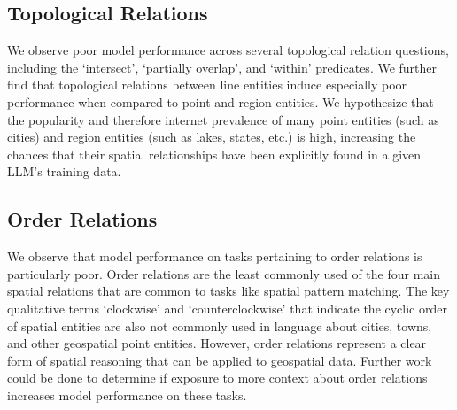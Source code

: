 \subsection{Topological Relations}
We observe poor model performance across several topological relation questions, including the `intersect', `partially overlap', and `within' predicates.
We further find that topological relations between line entities induce especially poor performance when compared to point and region entities.
We hypothesize that the popularity and therefore internet prevalence of many point entities (such as cities) and region entities (such as lakes, states, etc.) is high, increasing the chances that their spatial relationships have been explicitly found in a given LLM's training data.


\subsection{Order Relations}
We observe that model performance on tasks pertaining to order relations is particularly poor.
Order relations are the least commonly used of the four main spatial relations that are common to tasks like spatial pattern matching.
The key qualitative terms `clockwise' and `counterclockwise' that indicate the cyclic order of spatial entities are also not commonly used in language about cities, towns, and other geospatial point entities.
However, order relations represent a clear form of spatial reasoning that can be applied to geospatial data.
Further work could be done to determine if exposure to more context about order relations increases model performance on these tasks.